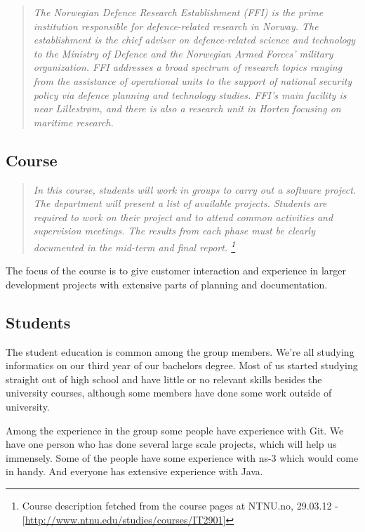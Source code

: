     \begin{quotation}
    \em The Norwegian Defence Research Establishment (FFI) is the prime institution responsible for defence-related research in Norway. The establishment is the chief adviser on defence-related science and technology to the Ministry of Defence and the Norwegian Armed Forces’ military organization. FFI addresses a broad spectrum of research topics ranging from the assistance of operational units to the support of national security policy via defence planning and technology studies. FFI's main facility is near Lillestrøm, and there is also a research unit in Horten focusing on maritime research.
    \end{quotation}
    
    \subsection{Course}\label{Course}
    \begin{quotation}
    \em In this course, students will work in groups to carry out a software project. The department will present a list of available projects. Students are required to work on their project and to attend common activities and supervision meetings. The results from each phase must be clearly documented in the mid-term and final report.
    \footnote{Course description fetched from the course pages at NTNU.no, 29.03.12 - [\url{http://www.ntnu.edu/studies/courses/IT2901}]}
    \end{quotation}
    
    The focus of the course is to give customer interaction and experience in larger development projects with extensive parts of planning and documentation. 
    
    
    \subsection{Students}\label{Students}
    The student education is common among the group members. We're all studying informatics on our third year of our bachelors degree. Most of us started studying straight out of high school and have little or no relevant skills besides the university courses, although some members have done some work outside of university. 
    
    Among the experience in the group some people have experience with Git. We have one person who has done several large scale projects, which will help us immensely. Some of the people have some experience with ns-3 which would come in handy. And everyone has extensive experience with Java.
    

